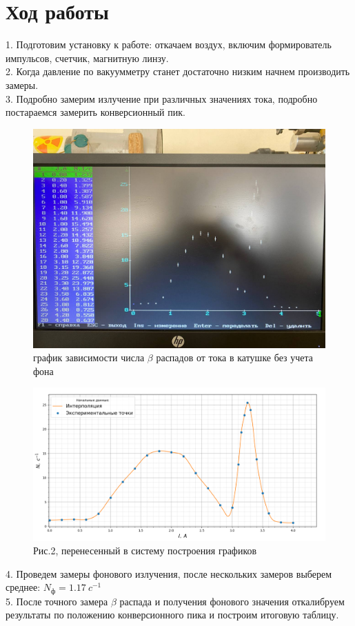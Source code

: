 \documentclass[a4paper,12pt]{article} %
\begin{document}
	\section{Ход работы}
	1. Подготовим установку к работе: откачаем воздух, включим формирователь импульсов, счетчик, магнитную линзу.\\
	2. Когда давление по вакуумметру станет достаточно низким начнем производить замеры.\\
	3. Подробно замерим излучение при различных значениях тока, подробно постараемся замерить конверсионный пик.
	\begin{figure}[H]
		\centering
		\includegraphics[width=0.7\linewidth]{pc_1}
		\caption{график зависимости числа $\beta$ распадов от тока в катушке без учета фона}
		\label{fig:pc1}
	\end{figure}
	\begin{figure}[H]
		\centering
		\includegraphics[width=0.9\linewidth]{graph_1}
		\caption{Рис.2, перенесенный в систему построения графиков}
		\label{fig:graph1}
	\end{figure}
	4. Проведем замеры фонового излучения, после нескольких замеров выберем среднее: $N_{\text{ф}}=1.17~c^{-1}$\\
	5. После точного замера $\beta$ распада и получения фонового значения откалибруем результаты по положению конверсионного пика и построим итоговую таблицу.\\
\end{document}
